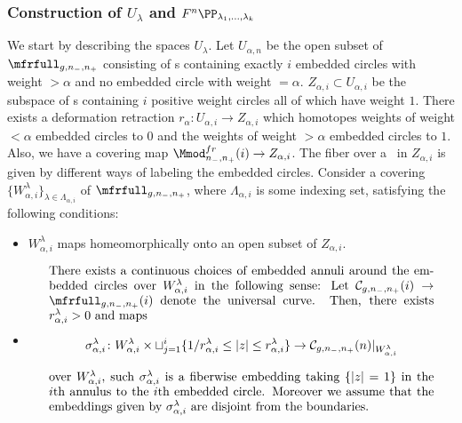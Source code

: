 \documentclass[a4paper,10pt]{amsart}
\begin{document}
\subsubsection{Construction of $U_{\lambda}$ and $F^n \PP_{\lambda_1,...,\lambda_k}$}
We start by describing the spaces $U_{\lambda}$. Let $U_{\alpha, n}$ be the open subset of $\mfrfull_{g,n_-,n_+}$ consisting of \splitsurface s containing exactly $i$ embedded circles with weight $>\alpha$ and no embedded circle with weight $=\alpha$. $Z_{\alpha,i} \subset U_{\alpha,i}$ be the subspace of \splitsurface s containing $i$ positive weight circles all of which have weight $1$. There exists a deformation retraction $r_{\alpha} \colon U_{\alpha,i} \to Z_{\alpha,i}$ which homotopes weights of weight $<\alpha$ embedded circles to $0$ and the weights of weight $>\alpha$ embedded circles to $1$. Also, we have a covering map $\Mmod^{fr}_{n_-,n_+}(i) \to Z_{\alpha,i}$. The fiber over a \splitsurface \ in $Z_{\alpha,i}$ is given by different ways of labeling the embedded circles. Consider a covering $\{W^{\lambda}_{\alpha,i}\}
_{\lambda \in \Lambda_{\alpha,i}}$  of $\mfrfull_{g,n_-,n_+}$, where $ \Lambda_{\alpha,i}$ is some indexing set, satisfying the following conditions:
	\begin{itemize}
		\item $W^{\lambda}_{\alpha,i}$ maps homeomorphically onto an open subset of $Z_{\alpha,i}$.
		\item \begin{equation} 
		\begin{minipage}{0.9\textwidth}
	 There exists a continuous choices of embedded annuli around the embedded circles over $W_{\alpha,i}^{\lambda}$ in the following sense: Let $\mathcal{C}_{g,n_-,n_+}(i) \to \mfrfull_{g,n_-,n_+}(i)$ denote the universal curve. Then, there exists $r^{\lambda}_{\alpha,i}>0$ and maps
	\[ \sigma_{\alpha, i}^{\lambda} \colon W_{\alpha,i}^{\lambda} \times \sqcup_{j=1}^i \{1/r^{\lambda}_{\alpha,i} \leq |z| \leq r^{\lambda}_{\alpha,i}\} \to \mathcal{C}_{g,n_-,n_+}(n)|_{W_{\alpha,i}^{\lambda}} \]
	over $W_{\alpha,i}^{\lambda}$, such $\sigma_{\alpha,i}^{\lambda}$ is a fiberwise embedding taking $\{|z|=1\}$ in the $i$th annulus to the $i$th embedded circle. Moreover we assume that the embeddings given by $\sigma_{\alpha,i}^{\lambda}$ are disjoint from the boundaries.
		\end{minipage}
	\end{equation}
	\end{itemize}

\end{document}
